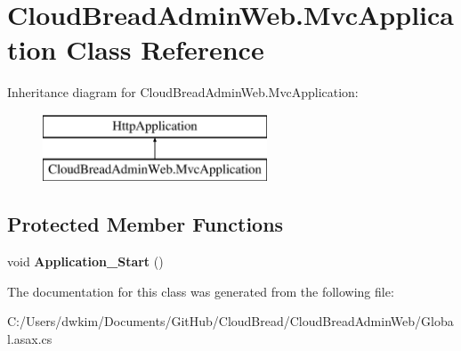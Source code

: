 \hypertarget{class_cloud_bread_admin_web_1_1_mvc_application}{}\section{Cloud\+Bread\+Admin\+Web.\+Mvc\+Application Class Reference}
\label{class_cloud_bread_admin_web_1_1_mvc_application}
Inheritance diagram for Cloud\+Bread\+Admin\+Web.\+Mvc\+Application\+:\begin{figure}[H]
\begin{center}
\leavevmode
\includegraphics[height=2.000000cm]{class_cloud_bread_admin_web_1_1_mvc_application}
\end{center}
\end{figure}
\subsection*{Protected Member Functions}
\begin{DoxyCompactItemize}
\item 
void {\bfseries Application\+\_\+\+Start} ()\hypertarget{class_cloud_bread_admin_web_1_1_mvc_application_afb0486ff316f2e219b9096853abaa930}{}\label{class_cloud_bread_admin_web_1_1_mvc_application_afb0486ff316f2e219b9096853abaa930}

\end{DoxyCompactItemize}


The documentation for this class was generated from the following file\+:\begin{DoxyCompactItemize}
\item 
C\+:/\+Users/dwkim/\+Documents/\+Git\+Hub/\+Cloud\+Bread/\+Cloud\+Bread\+Admin\+Web/Global.\+asax.\+cs\end{DoxyCompactItemize}
